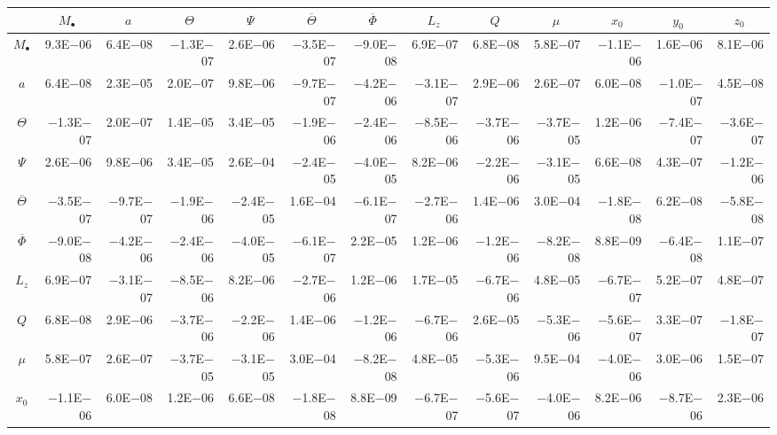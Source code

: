\begin{sidewaystable}[htbp]\scriptsize
\centering
\begin{tabular}{crrrrrrrrrrrr}
\toprule
 & \multicolumn{1}{c}{$M_\bullet$} & \multicolumn{1}{c}{$a$} & \multicolumn{1}{c}{$\Theta$} & \multicolumn{1}{c}{$\Psi$} & \multicolumn{1}{c}{$\overline{\Theta}$} & \multicolumn{1}{c}{$\overline{\Phi}$} & \multicolumn{1}{c}{$L_z$} & \multicolumn{1}{c}{$Q$} & \multicolumn{1}{c}{$\mu$} & \multicolumn{1}{c}{$x_0$} & \multicolumn{1}{c}{$y_0$} & \multicolumn{1}{c}{$z_0$} \\ \midrule 
$M_\bullet$ & 9.3E$-$06 & 6.4E$-$08 & $-$1.3E$-$07 & 2.6E$-$06 & $-$3.5E$-$07 & $-$9.0E$-$08 & 6.9E$-$07 & 6.8E$-$08 & 5.8E$-$07 & $-$1.1E$-$06 & 1.6E$-$06 & 8.1E$-$06 \\
$a$ & 6.4E$-$08 & 2.3E$-$05 & 2.0E$-$07 & 9.8E$-$06 & $-$9.7E$-$07 & $-$4.2E$-$06 & $-$3.1E$-$07 & 2.9E$-$06 & 2.6E$-$07 & 6.0E$-$08 & $-$1.0E$-$07 & 4.5E$-$08 \\
$\Theta$ & $-$1.3E$-$07 & 2.0E$-$07 & 1.4E$-$05 & 3.4E$-$05 & $-$1.9E$-$06 & $-$2.4E$-$06 & $-$8.5E$-$06 & $-$3.7E$-$06 & $-$3.7E$-$05 & 1.2E$-$06 & $-$7.4E$-$07 & $-$3.6E$-$07 \\
$\Psi$ & 2.6E$-$06 & 9.8E$-$06 & 3.4E$-$05 & 2.6E$-$04 & $-$2.4E$-$05 & $-$4.0E$-$05 & 8.2E$-$06 & $-$2.2E$-$06 & $-$3.1E$-$05 & 6.6E$-$08 & 4.3E$-$07 & $-$1.2E$-$06 \\
$\overline{\Theta}$ & $-$3.5E$-$07 & $-$9.7E$-$07 & $-$1.9E$-$06 & $-$2.4E$-$05 & 1.6E$-$04 & $-$6.1E$-$07 & $-$2.7E$-$06 & 1.4E$-$06 & 3.0E$-$04 & $-$1.8E$-$08 & 6.2E$-$08 & $-$5.8E$-$08 \\
$\overline{\Phi}$ & $-$9.0E$-$08 & $-$4.2E$-$06 & $-$2.4E$-$06 & $-$4.0E$-$05 & $-$6.1E$-$07 & 2.2E$-$05 & 1.2E$-$06 & $-$1.2E$-$06 & $-$8.2E$-$08 & 8.8E$-$09 & $-$6.4E$-$08 & 1.1E$-$07 \\
$L_z$ & 6.9E$-$07 & $-$3.1E$-$07 & $-$8.5E$-$06 & 8.2E$-$06 & $-$2.7E$-$06 & 1.2E$-$06 & 1.7E$-$05 & $-$6.7E$-$06 & 4.8E$-$05 & $-$6.7E$-$07 & 5.2E$-$07 & 4.8E$-$07 \\
$Q$ & 6.8E$-$08 & 2.9E$-$06 & $-$3.7E$-$06 & $-$2.2E$-$06 & 1.4E$-$06 & $-$1.2E$-$06 & $-$6.7E$-$06 & 2.6E$-$05 & $-$5.3E$-$06 & $-$5.6E$-$07 & 3.3E$-$07 & $-$1.8E$-$07 \\
$\mu$ & 5.8E$-$07 & 2.6E$-$07 & $-$3.7E$-$05 & $-$3.1E$-$05 & 3.0E$-$04 & $-$8.2E$-$08 & 4.8E$-$05 & $-$5.3E$-$06 & 9.5E$-$04 & $-$4.0E$-$06 & 3.0E$-$06 & 1.5E$-$07 \\
$x_0$ & $-$1.1E$-$06 & 6.0E$-$08 & 1.2E$-$06 & 6.6E$-$08 & $-$1.8E$-$08 & 8.8E$-$09 & $-$6.7E$-$07 & $-$5.6E$-$07 & $-$4.0E$-$06 & 8.2E$-$06 & $-$8.7E$-$06 & 2.3E$-$06 \\

\end{tabular}
\end{sidewaystable}
